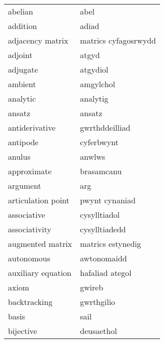 \begin{supertabular}{p{0.22\textwidth}p{0.22\textwidth}}
                         abelian &                            abel \\
                        addition &                           adiad \\
                adjacency matrix &            matrics cyfagosrwydd \\
                         adjoint &                           atgyd \\
                        adjugate &                        atgydiol \\
                         ambient &                       amgylchol \\
                        analytic &                        analytig \\
                          ansatz &                          ansatz \\
                  antiderivative &                  gwrthddeilliad \\
                        antipode &                      cyferbwynt \\
                          anulus &                          anwlws \\
                     approximate &                      brasamcanu \\
                        argument &                             arg \\
              articulation point &                  pwynt cynaniad \\
                     associative &                    cysylltiadol \\
                   associativity &                   cysylltiadedd \\
                augmented matrix &               matrics estynedig \\
                      autonomous &                     awtonomaidd \\
              auxiliary equation &                 hafaliad ategol \\
                           axiom &                          gwireb \\
                    backtracking &                      gwrthgilio \\
                           basis &                            sail \\
                       bijective &                      deusaethol \\

\end{supertabular}
